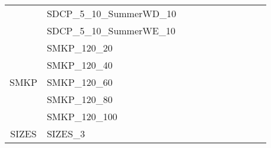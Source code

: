 \begin{table}[]
{\begin{tabular}{|c|l|lll|lll|l|l|l|}
			& SDCP\_5\_10\_SummerWD\_10     &                                   &                                 &             &                           &                         &      &                                         &                                 &                                \\
			& SDCP\_5\_10\_SummerWE\_10     &                                   &                                 &             &                           &                         &      &                                         &                                 &                                \\ \hline
			\multirow{5}{*}{SMKP}    & SMKP\_120\_20                 &                                   &                                 &             &                           &                         &      &                                         &                                 &                                \\
			& SMKP\_120\_40                 &                                   &                                 &             &                           &                         &      &                                         &                                 &                                \\
			& SMKP\_120\_60                 &                                   &                                 &             &                           &                         &      &                                         &                                 &                                \\
			& SMKP\_120\_80                 &                                   &                                 &             &                           &                         &      &                                         &                                 &                                \\
			& SMKP\_120\_100                &                                   &                                 &             &                           &                         &      &                                         &                                 &                                \\ \hline
			\multirow{3}{*}{SIZES}   & SIZES\_3                      &                                   &                                 &             &                           &                         &      &                                         &                                 &                                \\

\end{tabular}}
\end{table}
